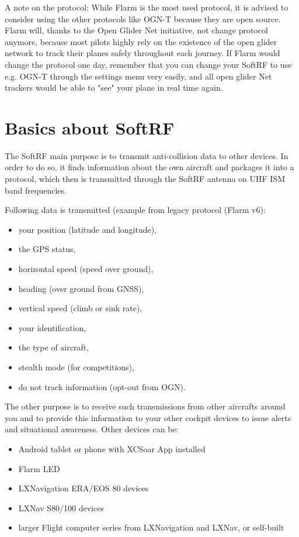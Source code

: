 \documentclass[10pt,a4paper]{article}
\begin{document}
A note on the protocol: While Flarm is the most used protocol, it is advised to consider using the other protocols like OGN-T because they are open source. Flarm will, thanks to the Open Glider Net initiative, not change protocol anymore, because most pilots highly rely on the existence of the open glider network to track their planes safely throughout each journey. If Flarm would change the protocol one day, remember that you can change your SoftRF to use e.g. OGN-T through the settings menu very easily, and all open glider Net trackers would be able to "see" your plane in real time again.

\section{Basics about SoftRF}
The SoftRF main purpose is to transmit anti-collision data to other devices. In order to do so, it finds information about the own aircraft and packages it into a protocol, which then is transmitted through the SoftRF antenna on UHF ISM band frequencies.

Following data is transmitted (example from legacy protocol (Flarm v6):
\begin{itemize}
\item your position (latitude and longitude),
\item the GPS status,
\item horizontal speed (speed over ground),
\item heading (over ground from GNSS),
\item vertical speed (climb or sink rate),
\item your identification,
\item the type of aircraft,
\item stealth mode (for competitions),
\item do not track information (opt-out from OGN).
\end{itemize}

The other purpose is to receive such transmissions from other aircrafts around you and to provide this information to your other cockpit devices to issue alerts and situational awareness. Other devices can be:

\begin{itemize}
\item Android tablet or phone with XCSoar App installed
\item Flarm LED
\item LXNavigation ERA/EOS 80 devices
\item LXNav S80/100 devices
\item larger Flight computer series from LXNavigation and LXNav, or self-built
\end{itemize}
\end{document}
